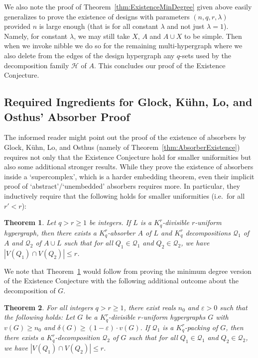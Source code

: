 \documentclass[11pt]{article}
\newcounter{i}
\theoremstyle{plain}
\newtheorem{thm}{Theorem}[section]
\theoremstyle{plain} %
\theoremstyle{definition}
\begin{document}
We also note the proof of Theorem~\ref{thm:ExistenceMinDegree} given above easily generalizes to prove the existence of designs with parameters $(n,q,r,\lambda)$ provided $n$ is large enough (that is for all constant $\lambda$ and not just $\lambda=1$). Namely, for constant $\lambda$, we may still take $X$, $A$ and $A\cup X$ to be simple. Then when we invoke nibble we do so for the remaining multi-hypergraph where we also delete from the edges of the design hypergraph any $q$-sets used by the decomposition family $\mathcal{H}$ of $A$. This concludes our proof of the Existence Conjecture.

\subsection{Required Ingredients for Glock, K\"{u}hn, Lo, and Osthus' Absorber Proof}

The informed reader might point out the proof of the existence of absorbers by Glock, K\"{u}hn, Lo, and Osthus (namely of Theorem~\ref{thm:AbsorberExistence}) requires not only that the Existence Conjecture hold for smaller uniformities but also some additional stronger results. While they prove the existence of absorbers inside a `supercomplex', which is a harder embedding theorem, even their implicit proof of `abstract'/`unembedded' absorbers requires more. In particular, they inductively require that the following holds for smaller uniformities (i.e.~for all $r' < r$): 

\begin{thm}\label{thm:CogirthAbsorber}
Let $q>r\ge 1$ be integers. If $L$ is a $K_q^r$-divisible $r$-uniform hypergraph, then there exists a $K_q^r$-absorber $A$ of $L$ and $K_q^r$ decompositions $\mathcal{Q}_1$ of $A$ and $\mathcal{Q}_2$ of $A\cup L$ such that for all $Q_1\in \mathcal{Q}_1$ and $Q_2\in\mathcal{Q}_2$, we have $|V(Q_1)\cap V(Q_2)|\le r$.
\end{thm}

We note that Theorem~\ref{thm:CogirthAbsorber} would follow from proving the minimum degree version of the Existence Conjecture with the following additional outcome about the decomposition of $G$.

\begin{thm}\label{thm:MinCogirthSteiner}
For all integers $q > r \geq 1$, there exist reals $n_0$ and $\varepsilon > 0$ such that the following holds: Let $G$ be a $K_q^r$-divisible $r$-uniform hypergraphs $G$ with $v(G)\ge n_0$ and $\delta(G) \ge (1-\varepsilon)\cdot v(G)$. If $\mathcal{Q}_1$ is a $K_q^r$-packing of $G$, then there exists a $K_q^r$-decomposition $\mathcal{Q}_2$ of $G$ such that for all $Q_1\in \mathcal{Q}_1$ and $Q_2\in\mathcal{Q}_2$, we have $|V(Q_1)\cap V(Q_2)|\le r$.
\end{thm}
\end{document}
